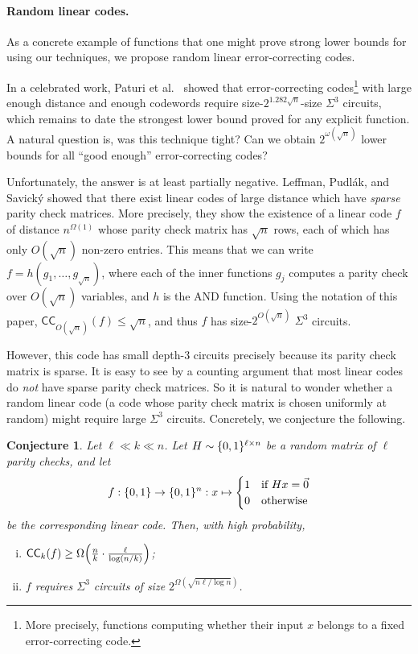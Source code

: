 \documentclass[10pt,a4paper]{article}
\newtheorem{conjecture}[lemma]{Conjecture}
\theoremstyle{definition}
\theoremstyle{remark}
\DeclarePairedDelimiter{\set}{\{}{\}}
\DeclarePairedDelimiter{\p}{(}{)}
\newcommand{\zo}{\set{0,1}}
\newcommand{\CC}{\mathsf{CC}}
\begin{document}
\paragraph*{Random linear codes.} As a concrete example of functions that one might prove strong lower bounds for using our techniques, we propose random linear error-correcting codes.

In a celebrated work, Paturi et al.~\cite{PPSZ05} showed that error-correcting codes\footnote{More precisely, functions computing whether their input $x$ belongs to a fixed error-correcting code.} with large enough distance and enough codewords require size-$2^{1.282 \sqrt{n}}$-size $\Sigma^3$ circuits, which remains to date the strongest lower bound proved for any explicit function.
A natural question is, was this technique tight?
Can we obtain $2^{\omega(\sqrt{n})}$ lower bounds for all ``good enough'' error-correcting codes?

Unfortunately, the answer is at least partially negative.
Leffman, Pudlák, and Savický \cite{LPS97} showed that there exist linear codes of large distance which have \emph{sparse} parity check matrices.
More precisely, they show the existence of a linear code $f$ of distance $n^{\Omega(1)}$ whose parity check matrix has $\sqrt{n}$ rows, each of which has only $O(\sqrt{n})$ non-zero entries.
This means that we can write $f=h(g_1, \ldots, g_{\sqrt{n}})$, where each of the inner functions $g_j$ computes a parity check over $O(\sqrt{n})$ variables, and $h$ is the AND function.
Using the notation of this paper, $\CC_{O(\sqrt{n})}(f) \leq \sqrt{n}$, and thus $f$ has size-$2^{O(\sqrt{n})}$ $\Sigma^3$ circuits.

However, this code has small depth-3 circuits precisely because its parity check matrix is sparse.
It is easy to see by a counting argument that most linear codes do \emph{not} have sparse parity check matrices.
So it is natural to wonder whether a random linear code (a code whose parity check matrix is chosen uniformly at random) might require large $\Sigma^3$ circuits.
Concretely, we conjecture the following.

\begin{conjecture}
\label{conj:random-codes}
Let $\ell \ll k \ll n$. Let $H \sim \zo^{\ell \times n}$ be a random matrix of $\ell$ parity checks, and let
\[
f: \zo \to \zo^n : x \mapsto
\begin{cases}
1 & \text{if $Hx = \Vec{0}$}\\
0 & \text{otherwise}
\end{cases}
\]
be the corresponding linear code. Then, with high probability,
\begin{enumerate}[(i)]
    \item $\CC_k(f) \geq \Omega\p*{\frac{n}{k} \cdot \frac{\ell}{\log(n/k)}}$;
    \item $f$ requires $\Sigma^3$ circuits of size $2^{\Omega(\sqrt{n\ell / \log n})}$.
\end{enumerate}
\end{conjecture}
\end{document}
